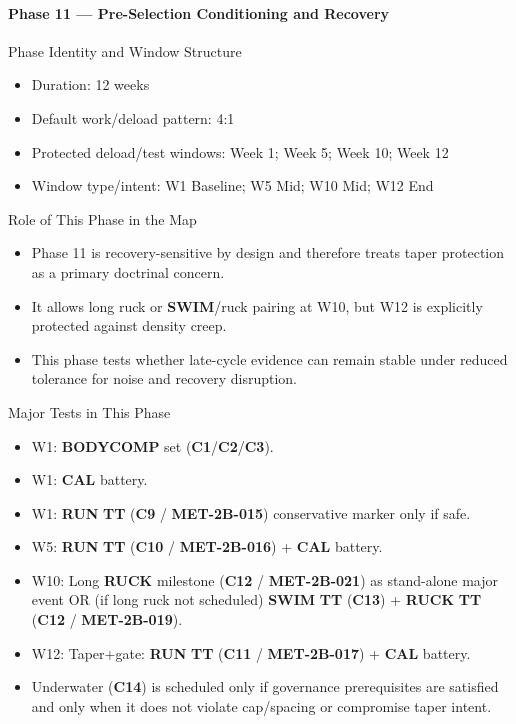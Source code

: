 \documentclass[10pt]{article}
\begin{document}
\newpage
\paragraph*{Phase 11 — Pre-Selection Conditioning and Recovery}

Phase Identity and Window Structure

\begin{itemize}
\item Duration: 12 weeks
\item Default work/deload pattern: 4:1
\item Protected deload/test windows: Week 1; Week 5; Week 10; Week 12
\item Window type/intent: W1 Baseline; W5 Mid; W10 Mid; W12 End
\end{itemize}

Role of This Phase in the Map

\begin{itemize}
\item Phase 11 is recovery-sensitive by design and therefore treats taper protection as a primary doctrinal concern.
\item It allows long ruck or \textbf{SWIM}/ruck pairing at W10, but W12 is explicitly protected against density creep.
\item This phase tests whether late-cycle evidence can remain stable under reduced tolerance for noise and recovery disruption.
\end{itemize}

Major Tests in This Phase

\begin{itemize}
\item W1: \textbf{BODYCOMP} set (\textbf{C1}/\textbf{C2}/\textbf{C3}).
\item W1: \textbf{CAL} battery.
\item W1: \textbf{RUN} \textbf{TT} (\textbf{C9} / \textbf{MET-2B-015}) conservative marker only if safe.
\item W5: \textbf{RUN} \textbf{TT} (\textbf{C10} / \textbf{MET-2B-016}) + \textbf{CAL} battery.
\item W10: Long \textbf{RUCK} milestone (\textbf{C12} / \textbf{MET-2B-021}) as stand-alone major event OR (if long ruck not scheduled) \textbf{SWIM} \textbf{TT} (\textbf{C13}) + \textbf{RUCK} \textbf{TT} (\textbf{C12} / \textbf{MET-2B-019}).
\item W12: Taper+gate: \textbf{RUN} \textbf{TT} (\textbf{C11} / \textbf{MET-2B-017}) + \textbf{CAL} battery.
\item Underwater (\textbf{C14}) is scheduled only if governance prerequisites are satisfied and only when it does not violate cap/spacing or compromise taper intent.
\end{itemize}
\end{document}
